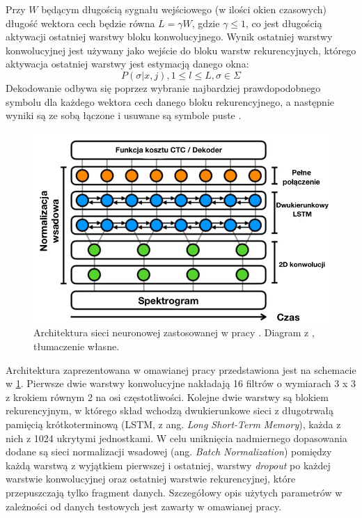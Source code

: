 \documentclass[12pt,a4paper,twoside]{mwart}
\begin{document}
Przy $W$ będącym długością sygnału wejściowego (w ilości okien czasowych) długość wektora cech będzie równa $L = \gamma W$, gdzie $\gamma \leqslant 1$, co jest długością aktywacji ostatniej warstwy bloku konwolucyjnego. Wynik ostatniej warstwy konwolucyjnej jest używany jako wejście do bloku warstw rekurencyjnych, którego aktywacja ostatniej warstwy jest estymacją danego okna:
\begin{equation}
  P(\sigma | x, j), 1 \leqslant l \leqslant L, \sigma \in \Sigma 
\end{equation}
Dekodowanie odbywa się poprzez wybranie najbardziej prawdopodobnego symbolu dla każdego wektora cech danego bloku rekurencyjnego, a następnie wyniki są ze sobą łączone i usuwane są symbole puste 
\cite[2-5]{Transcription:Pertus:NeuralNetwork}
.


\begin{figure}[ht]
  \begin{center}
    \includegraphics[scale=0.5]{images/holisticNetworkArchitecture.jpg}
    \caption{Architektura sieci neuronowej zastosowanej w pracy  \cite{Transcription:Pertus:NeuralNetwork}. Diagram z 
    \cite[5]{Transcription:Pertus:NeuralNetwork}
    , tłumaczenie własne.}
    \label{fig:holisticNetworkArchitecture}
  \end{center}
\end{figure}

Architektura zaprezentowana w omawianej pracy przedstawiona jest na schemacie w \ref{fig:holisticNetworkArchitecture}. Pierwsze dwie warstwy konwolucyjne nakładają 16 filtrów o wymiarach 3 x 3 z krokiem równym 2 na osi częstotliwości. Kolejne dwie warstwy są blokiem rekurencyjnym, w którego skład wchodzą dwukierunkowe sieci z długotrwałą pamięcią krótkoterminową (LSTM, z ang. \textit{Long Short-Term Memory}), każda z nich z 1024 ukrytymi jednostkami. W celu uniknięcia nadmiernego dopasowania dodane są sieci normalizacji wsadowej (ang. \textit{Batch Normalization}) pomiędzy każdą warstwą z wyjątkiem pierwszej i ostatniej, warstwy \textit{dropout} po każdej warstwie konwolucyjnej oraz ostatniej warstwie rekurencyjnej, które przepuszczają tylko fragment danych. Szczegółowy opis użytych parametrów w zależności od danych testowych jest zawarty w omawianej pracy.
\end{document}
